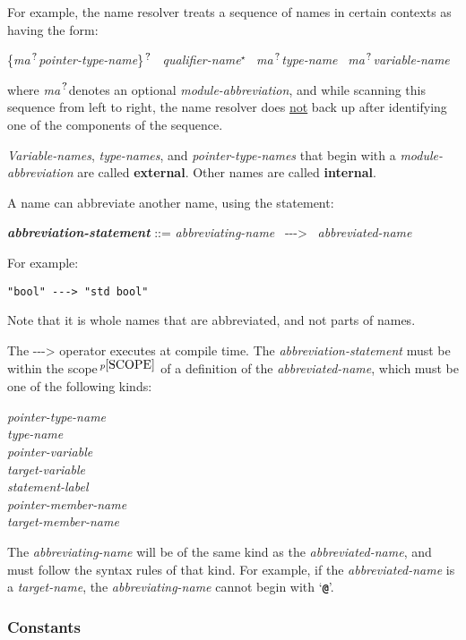 \documentclass[12pt]{article}
\newcommand{\TT}[1]{{\tt \bfseries #1}}
\newcommand{\STAR}{{\Large $^\star$}}
\newcommand{\QMARK}{{$^{\,\mbox{\footnotesize ?}}$}}
\newcommand{\ABV}{-{}-{}->}
\newcommand{\MA}{{\em ma}\QMARK}
\newcommand{\key}[1]{{\rm \bfseries #1}}
\newcommand{\emkey}[1]{{\em \bfseries #1}}
\newcommand{\pagnote}[1]{$\,^{p\pageref{#1}}$}
\newenvironment{indpar}[1][0.3in]%
	{\begin{list}{}%
		     {\setlength{\itemsep}{0in}%
		      \setlength{\topsep}{0in}%
		      \setlength{\parsep}{1ex}%
		      \setlength{\labelwidth}{#1}%
		      \setlength{\leftmargin}{#1}%
		      \addtolength{\leftmargin}{\labelsep}}%
	 \item}%
	{\end{list}}
\begin{document}
For example,
the name resolver treats a sequence of
names in certain contexts as having the form:
\begin{center}
\{\MA {\em pointer-type-name}\}\QMARK{}~
{\em qualifier-name}\STAR{}~
\MA {\em type-name}~
\MA {\em variable-name}
\end{center}
where \MA denotes an optional {\em module-abbreviation},
and while scanning this sequence from left to right,
the name resolver does \underline{not} back up after identifying
one of the components of the sequence.

{\em Variable-names}, {\em type-names}, and {\em pointer-type-names}
that begin with a {\em module-abbreviation} are called
\key{external}\label{EXTERNAL-NAME}.
Other names are called \key{internal}\label{INTERNAL-NAME}.

A name can abbreviate another name, using the statement:
\begin{indpar}
\emkey{abbreviation-statement} ::=
    {\em abbreviating-name}~ \ABV{}~ {\em abbreviated-name}
\end{indpar}
For example:
\begin{center}
\tt "bool" \ABV{} "std bool"
\end{center}

Note that it is whole names that are abbreviated, and not parts of
names.

The \ABV{} operator executes at compile time.  The {\em abbreviation-statement}
must be within the scope\pagnote{SCOPE}
of a definition of the {\em abbreviated-name},
which must be one of the following kinds:
\begin{center} \em
pointer-type-name \\
type-name \\
pointer-variable \\
target-variable \\
statement-label \\
pointer-member-name \\
target-member-name
\end{center}
The {\em abbreviating-name} will be of the same kind as the
{\em abbreviated-name}, and must follow the syntax rules of that
kind.  For example, if the {\em abbreviated-name}
is a {\em target-name}, the {\em abbreviating-name} cannot begin with
`\TT{@}'.


\subsubsection{Constants}
\label{CONSTANTS}
\end{document}
